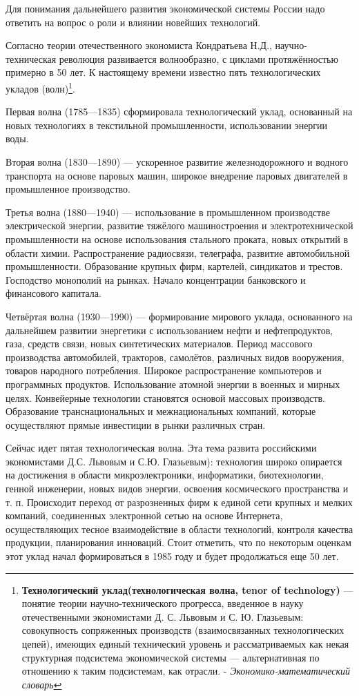 \documentclass[a4paper,12pt]{article}
\begin{document}
Для понимания дальнейшего развития экономической системы России надо ответить
на вопрос о роли и влиянии новейших технологий. 

Согласно теории отечественного экономиста Кондратьева Н.Д.\cite{Kondratiev},
научно-техническая революция развивается волнообразно, с циклами протяжённостью примерно в 50 лет. 
К настоящему времени известно пять технологических укладов (волн)\footnote{
\textbf{Технологический уклад(технологическая волна, tenor of technology)} — понятие теории
научно-технического прогресса, введенное в науку отечественными экономистами Д. С. Львовым и С. Ю. Глазьевым: совокупность 
сопряженных производств (взаимосвязанных технологических цепей), имеющих единый 
технический уровень и рассматриваемых как некая структурная подсистема 
экономической системы — альтернативная по отношению к таким подсистемам, 
как отрасли. - \textit{ Экономико-математический словарь\cite{Lopatnikov}} }.

Первая волна (1785—1835) сформировала технологический уклад, основанный на
новых технологиях в текстильной промышленности, использовании энергии воды.

Вторая волна (1830—1890) — ускоренное развитие железнодорожного и водного
транспорта на основе паровых машин, широкое внедрение паровых двигателей в
промышленное производство.

Третья волна (1880—1940) — использование в промышленном производстве
электрической энергии, развитие тяжёлого машиностроения и электротехнической
промышленности на основе использования стального проката, новых открытий в
области химии. Распространение радиосвязи, телеграфа, развитие автомобильной
промышленности. Образование крупных фирм, картелей, синдикатов и трестов.
Господство монополий на рынках. Начало концентрации банковского и финансового
капитала.

Четвёртая волна (1930—1990) — формирование мирового уклада, основанного на
дальнейшем развитии энергетики с использованием нефти и нефтепродуктов, газа,
средств связи, новых синтетических материалов. Период массового производства
автомобилей, тракторов, самолётов, различных видов вооружения, товаров
народного потребления. Широкое распространение компьютеров и программных
продуктов. Использование атомной энергии в военных и мирных целях. Конвейерные
технологии становятся основой массовых производств. Образование 
транснациональных и межнациональных компаний, которые осуществляют прямые
инвестиции в рынки различных стран.

Сейчас идет пятая технологическая волна. Эта тема развита 
российскими экономистами Д.С. Львовым\cite{Lvov} и С.Ю.
Глазьевым\cite{Glaziev}): технология широко опирается на достижения в
области микроэлектроники, информатики, биотехнологии, генной инженерии, новых видов энергии, освоения космического пространства и т. п.
Происходит переход от разрозненных фирм к единой сети крупных и мелких компаний, 
соединенных электронной сетью на основе Интернета, осуществляющих тесное взаимодействие 
в области технологий, контроля качества продукции, планирования инноваций. Стоит
отметить, что по некоторым оценкам этот уклад начал формироваться в 1985 году и
будет продолжаться еще 50 лет.
\end{document}
